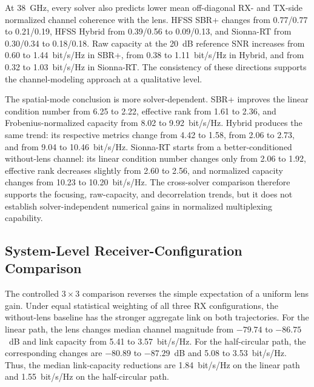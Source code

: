 At 38~GHz, every solver also predicts lower mean off-diagonal RX- and TX-side normalized channel coherence with the lens. HFSS SBR+ changes from 0.77/0.77 to 0.21/0.19, HFSS Hybrid from 0.39/0.56 to 0.09/0.13, and Sionna-RT from 0.30/0.34 to 0.18/0.18. Raw capacity at the 20~dB reference SNR increases from 0.60 to 1.44~bit/s/Hz in SBR+, from 0.38 to 1.11~bit/s/Hz in Hybrid, and from 0.32 to 1.03~bit/s/Hz in Sionna-RT. The consistency of these directions supports the channel-modeling approach at a qualitative level.

The spatial-mode conclusion is more solver-dependent. SBR+ improves the linear condition number from 6.25 to 2.22, effective rank from 1.61 to 2.36, and Frobenius-normalized capacity from 8.02 to 9.92~bit/s/Hz. Hybrid produces the same trend: its respective metrics change from 4.42 to 1.58, from 2.06 to 2.73, and from 9.04 to 10.46~bit/s/Hz. Sionna-RT starts from a better-conditioned without-lens channel: its linear condition number changes only from 2.06 to 1.92, effective rank decreases slightly from 2.60 to 2.56, and normalized capacity changes from 10.23 to 10.20~bit/s/Hz. The cross-solver comparison therefore supports the focusing, raw-capacity, and decorrelation trends, but it does not establish solver-independent numerical gains in normalized multiplexing capability.

\subsection{System-Level Receiver-Configuration Comparison}

The controlled $3\times3$ comparison reverses the simple expectation of a uniform lens gain. Under equal statistical weighting of all three RX configurations, the without-lens baseline has the stronger aggregate link on both trajectories. For the linear path, the lens changes median channel magnitude from $-79.74$ to $-86.75$~dB and link capacity from 5.41 to 3.57~bit/s/Hz. For the half-circular path, the corresponding changes are $-80.89$ to $-87.29$~dB and 5.08 to 3.53~bit/s/Hz. Thus, the median link-capacity reductions are 1.84~bit/s/Hz on the linear path and 1.55~bit/s/Hz on the half-circular path.


